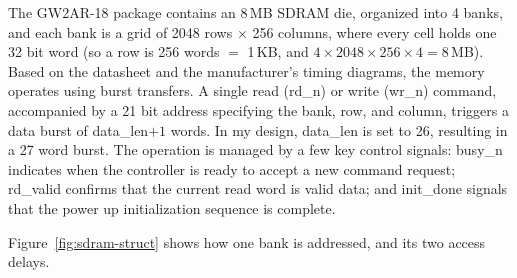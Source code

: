 \documentclass[a4paper,10pt]{article}
\begin{document}
The GW2AR-18 package contains an 8\,MB SDRAM die, organized into 4 banks, and each bank
is a grid of 2048 rows $\times$ 256 columns, where every cell holds one 32 bit word
(so a row is 256 words $=$ 1\,KB, and $4\times2048\times256\times4 = 8$\,MB).
Based on the datasheet and the manufacturer's timing diagrams, 
the memory operates using burst transfers. A single read (rd\_n)
 or write (wr\_n) command, accompanied by a 21 bit address specifying the bank,
 row, and column, triggers a data burst of data\_len$+1$ words.
 In my design, data\_len is set to 26, resulting in a 27 word burst.
The operation is managed by a few key control signals: busy\_n 
indicates when the controller is ready to accept a new command request;
 rd\_valid confirms that the current read word is valid data; 
 and init\_done signals that the power up initialization sequence is complete.

Figure~\ref{fig:sdram-struct} shows how one bank is addressed, and its two
access delays.
\end{document}
